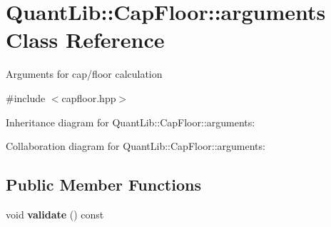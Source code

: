 \section{Quant\+Lib\+:\+:Cap\+Floor\+:\+:arguments Class Reference}
\label{class_quant_lib_1_1_cap_floor_1_1arguments}


Arguments for cap/floor calculation  




{\ttfamily \#include $<$capfloor.\+hpp$>$}



Inheritance diagram for Quant\+Lib\+:\+:Cap\+Floor\+:\+:arguments\+:


Collaboration diagram for Quant\+Lib\+:\+:Cap\+Floor\+:\+:arguments\+:
\subsection*{Public Member Functions}
\begin{DoxyCompactItemize}
\item 
void {\bfseries validate} () const \label{class_quant_lib_1_1_cap_floor_1_1arguments_a2461bcb6d2a19f72c8111445bcd1c603}

\end{DoxyCompactItemize}
